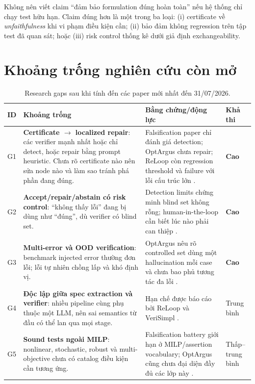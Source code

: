 \documentclass[11pt,a4paper]{article}
\begin{document}
\begin{warningbox}
Không nên viết claim ``đảm bảo formulation đúng hoàn toàn'' nếu hệ thống chỉ chạy test hữu hạn. Claim đúng hơn là một trong ba loại: (i) certificate về \emph{unfaithfulness} khi vi phạm điều kiện cần; (ii) bảo đảm không regression trên tập test đã quan sát; hoặc (iii) risk control thống kê dưới giả định exchangeability.
\end{warningbox}

\section{Khoảng trống nghiên cứu còn mở}

\begin{table}[htbp]
\centering
\caption{Research gaps sau khi tính đến các paper mới nhất đến 31/07/2026.}
\label{tab:gaps}
\small
\begin{tabularx}{\textwidth}{L{1.0cm} Y L{3.7cm} L{2.0cm}}
\toprule
\textbf{ID} & \textbf{Khoảng trống} & \textbf{Bằng chứng/động lực} & \textbf{Khả thi} \\
\midrule
G1 & \textbf{Certificate \(\rightarrow\) localized repair}: các verifier mạnh nhất hoặc chỉ detect, hoặc repair bằng prompt heuristic. Chưa rõ certificate nào nên sửa node nào và làm sao tránh phá phần đang đúng. & Falsification paper chỉ đánh giá detection; OptArgus chưa repair; ReLoop còn regression threshold và failure với lỗi cấu trúc lớn \parencite{li2026falsification,li2026optargus,lian2026reloop}. & \textbf{Cao} \\
G2 & \textbf{Accept/repair/abstain có risk control}: ``không thấy lỗi'' đang bị dùng như ``đúng'', dù verifier có blind set. & Detection limits chứng minh blind set không rỗng; human-in-the-loop cần biết lúc nào phải can thiệp \parencite{li2026falsification,xiao2025survey}. & \textbf{Cao} \\
G3 & \textbf{Multi-error và OOD verification}: benchmark injected error thường đơn lỗi; lỗi tự nhiên chồng lấp và khó định vị. & OptArgus nêu rõ controlled set dùng một hallucination mỗi case và chưa bao phủ tương tác đa lỗi \parencite{li2026optargus}. & \textbf{Cao} \\
G4 & \textbf{Độc lập giữa spec extraction và verifier}: nhiều pipeline cùng phụ thuộc một LLM, nên sai semantics từ đầu có thể lan qua mọi stage. & Hạn chế được báo cáo bởi ReLoop và VeriSimpl \parencite{lian2026reloop,rahman2026verisimpl}. & Trung bình \\
G5 & \textbf{Sound tests ngoài MILP}: nonlinear, stochastic, robust và multi-objective chưa có catalog điều kiện cần tương ứng. & Falsification battery giới hạn ở MILP/assertion vocabulary; OptArgus cũng chưa đại diện đầy đủ các lớp này \parencite{li2026falsification,li2026optargus}. & Thấp--trung bình \\
\bottomrule
\end{tabularx}
\end{table}
\end{document}
